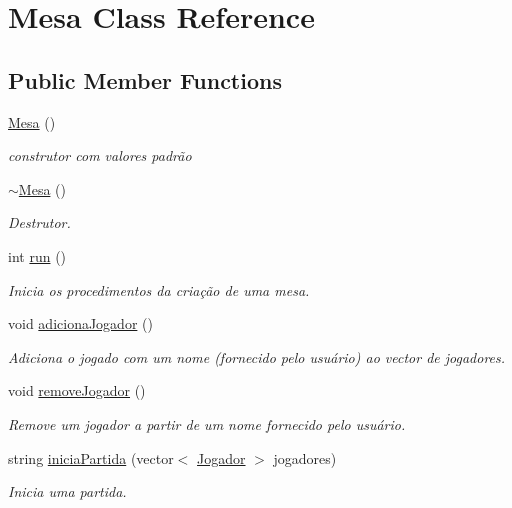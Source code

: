 \hypertarget{classMesa}{}\section{Mesa Class Reference}
\label{classMesa}
\subsection*{Public Member Functions}
\begin{DoxyCompactItemize}
\item 
\hyperlink{classMesa_a98794038db53804cb4295480c96b2c20}{Mesa} ()
\begin{DoxyCompactList}\small\item\em construtor com valores padrão \end{DoxyCompactList}\item 
\hyperlink{classMesa_aa0a1b83b8058f80f4f27ec46cc5e9524}{$\sim$\+Mesa} ()
\begin{DoxyCompactList}\small\item\em Destrutor. \end{DoxyCompactList}\item 
int \hyperlink{classMesa_a129bc8199f83880303f1b655eca5d95d}{run} ()
\begin{DoxyCompactList}\small\item\em Inicia os procedimentos da criação de uma mesa. \end{DoxyCompactList}\item 
void \hyperlink{classMesa_a06b001e907762c73065230bbae1b7272}{adiciona\+Jogador} ()
\begin{DoxyCompactList}\small\item\em Adiciona o jogado com um nome (fornecido pelo usuário) ao vector de jogadores. \end{DoxyCompactList}\item 
void \hyperlink{classMesa_a36f917140d77099e2da7a26586df04e8}{remove\+Jogador} ()
\begin{DoxyCompactList}\small\item\em Remove um jogador a partir de um nome fornecido pelo usuário. \end{DoxyCompactList}\item 
string \hyperlink{classMesa_ab4bb38a6eb841eeaf81ee09f379a8121}{inicia\+Partida} (vector$<$ \hyperlink{classJogador}{Jogador} $>$ jogadores)
\begin{DoxyCompactList}\small\item\em Inicia uma partida. \end{DoxyCompactList}\item 

\end{DoxyCompactItemize}
